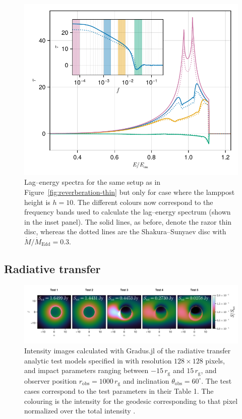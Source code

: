 \documentclass[fleqn,usenatbib]{mnras}
\newcommand{\software}[1]{{\sc #1}}
\newcommand{\Gradus}{\software{Gradus.jl}\xspace}
\newcommand{\rg}{r_\text{g}}
\begin{document}
\begin{figure}
    \centering
    \includegraphics[width=0.98\columnwidth]{figures/reverberation.lag-energy.pdf}
    \caption{Lag--energy spectra for the same setup as in
        Figure~\ref{fig:reverberation-thin} but only for case where the lamppost
        height is $h=10$. The different colours now correspond to the frequency
        bands used to calculate the lag--energy spectrum (shown in the inset
        panel). The solid lines, as before, denote the razor thin disc, whereas
    the dotted lines are the Shakura--Sunyaev disc with $\dot{M} /
\dot{M}_\text{Edd} =0.3$.}
    \label{fig:lag-energy}
\end{figure}


\subsection{Radiative transfer}

\begin{figure}
    \centering
    \includegraphics[width=0.99\linewidth]{figures/radiative-transfer.gold.png}
    \caption{Intensity images calculated with \Gradus of the radiative transfer
    analytic test models specified in \citet{gold_verification_2020} with
    resolution $128 \times 128$ pixels, and impact parameters ranging between $-15\,
    \rg$ and $15\, \rg$, and observer position $r_\text{obs} = 1000\, \rg$ and
    inclination $\theta_\text{obs} = 60^\circ$. The test cases correspond to the
    test parameters in their Table 1. The colouring is the intensity for the
    geodesic corresponding to that pixel normalized over the total intensity .}
    \label{fig:gold-test-problems}
\end{figure}
\end{document}

